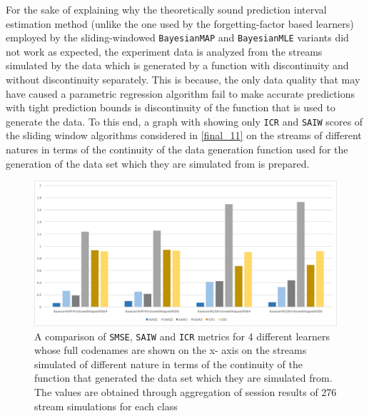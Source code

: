 For the sake of explaining why the theoretically sound prediction interval estimation method (unlike the one used by the forgetting-factor based learners) employed by the sliding-windowed \texttt{BayesianMAP} and \texttt{BayesianMLE} variants did not work as expected, the experiment data is analyzed from the streams simulated by the data which is generated by a function with discontinuity and without discontinuity separately. This is because, the only data quality that may have caused a parametric regression algorithm fail to make accurate predictions with tight prediction bounds is discontinuity of the function that is used to generate the data. To this end, a graph with showing only \texttt{ICR} and \texttt{SAIW} scores of the sliding window algorithms considered in \ref{final_11} on the streams of different natures in terms of the continuity of the data generation function used for the generation of the data set which they are simulated from is prepared.

\begin{figure}[htbp]
  \centering
    \includegraphics[width=\linewidth]{./Figures/disc_nondisc_bmap_bmap_mapped_ws64_ws96.pdf}
  \caption{A comparison of \texttt{SMSE}, \texttt{SAIW} and \texttt{ICR} metrics for 4 different learners whose full codenames are shown on the x- axis on the streams simulated of different nature in terms of the continuity of the function that generated the data set which they are simulated from. The values are obtained through aggregation of session results of 276 stream simulations for each class}
  \label{fig:disc_nondisc_bmap_bmap_mapped_ws64_ws96}
\end{figure}

